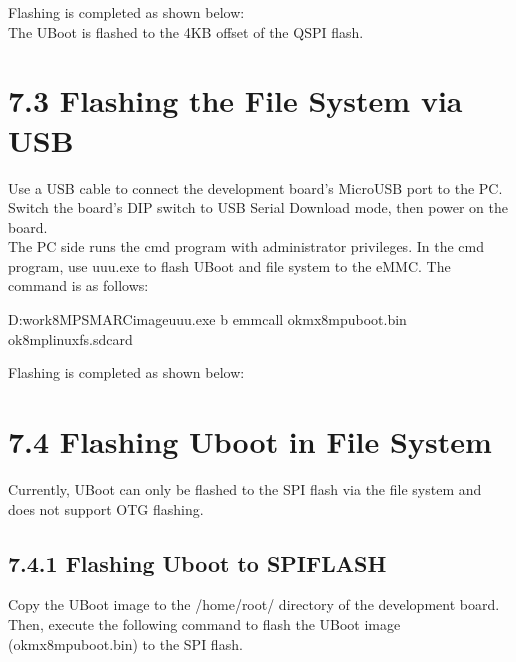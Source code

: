 \documentclass[letterpaper,10pt,openany,english]{sphinxmanual}
\begin{document}
\sphinxAtStartPar
Flashing is completed as shown below:\\
The U\sphinxhyphen{}Boot is flashed to the 4KB offset of the QSPI flash.


\section{7.3 Flashing the File System via USB}
\label{\detokenize{linux-manual:flashing-the-file-system-via-usb}}
\sphinxAtStartPar
Use a USB cable to connect the development board’s Micro\sphinxhyphen{}USB port to the PC. Switch the board’s DIP switch to USB Serial Download mode, then power on the board.\\
The PC side runs the cmd program with administrator privileges. In the cmd program, use uuu.exe to flash U\sphinxhyphen{}Boot and file system to the eMMC. The command is as follows:

\begin{sphinxVerbatim}[commandchars=\\\{\}]
D:\PYGZbs{}work\PYGZbs{}8MP\PYGZus{}SMARC\PYGZbs{}image\PYGZgt{}uuu.exe \PYGZhy{}b emmc\PYGZus{}all ok\PYGZhy{}mx8mp\PYGZhy{}uboot.bin ok8mp\PYGZhy{}linux\PYGZhy{}fs.sdcard
\end{sphinxVerbatim}

\sphinxAtStartPar
Flashing is completed as shown below:


\section{7.4 Flashing Uboot in File System}
\label{\detokenize{linux-manual:flashing-uboot-in-file-system}}
\sphinxAtStartPar
Currently, U\sphinxhyphen{}Boot can only be flashed to the SPI flash via the file system and does not support OTG flashing.


\subsection{7.4.1 Flashing Uboot to SPIFLASH}
\label{\detokenize{linux-manual:flashing-uboot-to-spiflash}}
\sphinxAtStartPar
Copy the U\sphinxhyphen{}Boot image to the /home/root/ directory of the development board. Then, execute the following command to flash the U\sphinxhyphen{}Boot image (ok\sphinxhyphen{}mx8mp\sphinxhyphen{}uboot.bin) to the SPI flash.
\end{document}

